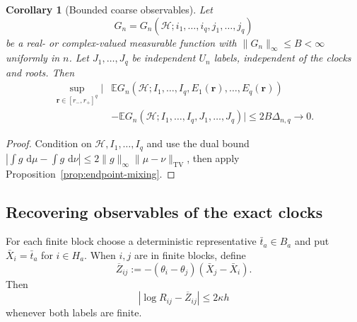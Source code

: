 \documentclass[11pt]{article}
\newcommand{\E}{\mathbb E}
\newcommand{\1}{\mathbf 1}
\newcommand{\TV}{\mathrm{TV}}
\newcommand{\cH}{\mathcal H}
\newcommand{\dd}{\,\mathrm d}
\newtheorem{corollary}[theorem]{Corollary}
\theoremstyle{definition}
\theoremstyle{remark}
\begin{document}
\begin{corollary}[Bounded coarse observables]
\label{cor:bounded-coarse-observables}
Let
\[
 G_n=G_n(\cH;i_1,\dots,i_q,j_1,\dots,j_q)
\]
be a real- or complex-valued measurable function with
$\|G_n\|_\infty\leq B<\infty$ uniformly in $n$.  Let
$J_1,\dots,J_q$ be independent $U_n$ labels, independent of the clocks
and roots.  Then
\begin{align}
 \sup_{\mathbf r\in[r_-,r_+]^q}
 \big|&\E G_n(\cH;I_1,\dots,I_q,E_1(\mathbf r),\dots,E_q(\mathbf r))
 \nonumber\\
 &-\E G_n(\cH;I_1,\dots,I_q,J_1,\dots,J_q)\big|
 \leq 2B\Delta_{n,q}\longrightarrow0.
 \label{eq:bounded-coarse-decorrelation}
\end{align}
\end{corollary}

\begin{proof}
Condition on $\cH,I_1,\dots,I_q$ and use the dual bound
$|\int g\,\dd\mu-\int g\,\dd\nu|\leq2\|g\|_\infty
\|\mu-\nu\|_{\TV}$, then apply Proposition~\ref{prop:endpoint-mixing}.
\end{proof}

\subsection{Recovering observables of the exact clocks}

For each finite block choose a deterministic representative
$\bar t_a\in B_a$ and put $\bar X_i=\bar t_a$ for $i\in H_a$.  When
$i,j$ are in finite blocks, define
\begin{equation}\label{eq:coarse-log-R}
 \overline Z_{ij}:=-(\theta_i-\theta_j)(\bar X_j-\bar X_i).
\end{equation}
Then
\begin{equation}\label{eq:coarse-log-R-error}
 |\log R_{ij}-\overline Z_{ij}|\leq2\kappa h
\end{equation}
whenever both labels are finite.
\end{document}
